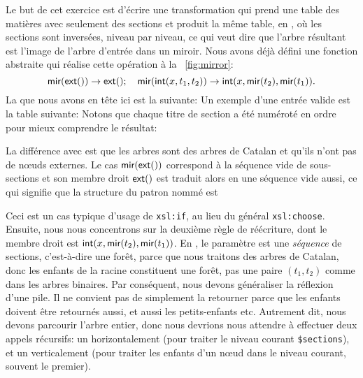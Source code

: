 
Le but de cet exercice est d'écrire une transformation \XSLT qui prend
une table des matières avec seulement des sections et produit la même
table, en \XML, où les sections sont inversées, niveau par niveau, ce
qui veut dire que l'arbre résultant est l'image de l'arbre d'entrée
dans un miroir. Nous avons déjà défini une fonction abstraite
 qui réalise cette opération à la \fig~\vref{fig:mirror}:
\begin{equation*}
\textsf{mir}(\textsf{ext}()) \rightarrow \textsf{ext}();
\quad
\textsf{mir}(\textsf{int}(x,t_1,t_2)) \rightarrow
\textsf{int}(x,\textsf{mir}(t_2),\textsf{mir}(t_1)).
\end{equation*}
\noindent La \DTD que nous avons en tête ici est la suivante:
\noindent Un exemple d'une entrée valide est la table suivante:
\noindent Notons que chaque titre de section a été numéroté en ordre
pour mieux comprendre le résultat:

La différence avec  est que les arbres \XML sont des arbres
de Catalan et qu'ils n'ont pas de nœuds externes. Le cas
\(\textsf{mir}(\textsf{ext}())\) correspond à la séquence vide de
sous-sections et son membre droit \(\textsf{ext}()\) est traduit alors en
une séquence vide aussi, ce qui signifie que la structure du patron
nommé est
Ceci est un cas typique d'usage de \texttt{xsl:if}, au lieu du général
\texttt{xsl:choose}. Ensuite, nous nous concentrons sur la deuxième
règle de réécriture, dont le membre droit est
\(\textsf{int}(x,\textsf{mir}(t_2),\textsf{mir}(t_1))\). En \XSLT, le paramètre
est une \emph{séquence} de sections, c'est-à-dire une forêt, parce que
nous traitons des arbres de Catalan, donc les enfants de la racine
constituent une forêt, pas une paire \((t_1, t_2)\) comme dans les
arbres binaires. Par conséquent, nous devons généraliser la réflexion
d'une pile. Il ne convient pas de simplement la retourner parce que
les enfants doivent être retournés aussi, et aussi les petits-enfants
etc. Autrement dit, nous devons parcourir l'arbre entier, donc nous
devrions nous attendre à effectuer deux appels récursifs: un
horizontalement (pour traiter le niveau courant \texttt{\$sections}),
et un verticalement (pour traiter les enfants d'un nœud dans le
niveau courant, souvent le premier).

